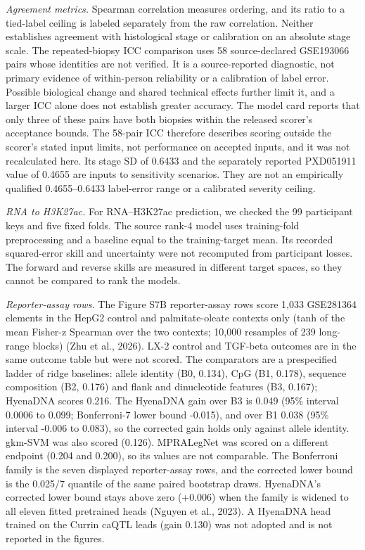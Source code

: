 \emph{Agreement metrics.} Spearman correlation measures ordering, and its ratio to a tied-label ceiling is labeled separately from the raw correlation. Neither establishes agreement with histological stage or calibration on an absolute stage scale. The repeated-biopsy ICC comparison uses 58 source-declared GSE193066 pairs whose identities are not verified. It is a source-reported diagnostic, not primary evidence of within-person reliability or a calibration of label error. Possible biological change and shared technical effects further limit it, and a larger ICC alone does not establish greater accuracy. The model card reports that only three of these pairs have both biopsies within the released scorer's acceptance bounds. The 58-pair ICC therefore describes scoring outside the scorer's stated input limits, not performance on accepted inputs, and it was not recalculated here. Its stage SD of 0.6433 and the separately reported PXD051911 value of 0.4655 are inputs to sensitivity scenarios. They are not an empirically qualified 0.4655--0.6433 label-error range or a calibrated severity ceiling.

\emph{RNA to H3K27ac.} For RNA--H3K27ac prediction, we checked the 99 participant keys and five fixed folds. The source rank-4 model uses training-fold preprocessing and a baseline equal to the training-target mean. Its recorded squared-error skill and uncertainty were not recomputed from participant losses. The forward and reverse skills are measured in different target spaces, so they cannot be compared to rank the models.

\emph{Reporter-assay rows.} The Figure S7B reporter-assay rows score 1,033 GSE281364 elements in the HepG2 control and palmitate-oleate contexts only (tanh of the mean Fisher-z Spearman over the two contexts; 10,000 resamples of 239 long-range blocks) (Zhu et al., 2026). LX-2 control and TGF-beta outcomes are in the same outcome table but were not scored. The comparators are a prespecified ladder of ridge baselines: allele identity (B0, 0.134), CpG (B1, 0.178), sequence composition (B2, 0.176) and flank and dinucleotide features (B3, 0.167); HyenaDNA scores 0.216. The HyenaDNA gain over B3 is 0.049 (95\% interval 0.0006 to 0.099; Bonferroni-7 lower bound -0.015), and over B1 0.038 (95\% interval -0.006 to 0.083), so the corrected gain holds only against allele identity. gkm-SVM was also scored (0.126). MPRALegNet was scored on a different endpoint (0.204 and 0.200), so its values are not comparable. The Bonferroni family is the seven displayed reporter-assay rows, and the corrected lower bound is the 0.025/7 quantile of the same paired bootstrap draws. HyenaDNA's corrected lower bound stays above zero (+0.006) when the family is widened to all eleven fitted pretrained heads (Nguyen et al., 2023). A HyenaDNA head trained on the Currin caQTL leads (gain 0.130) was not adopted and is not reported in the figures.

